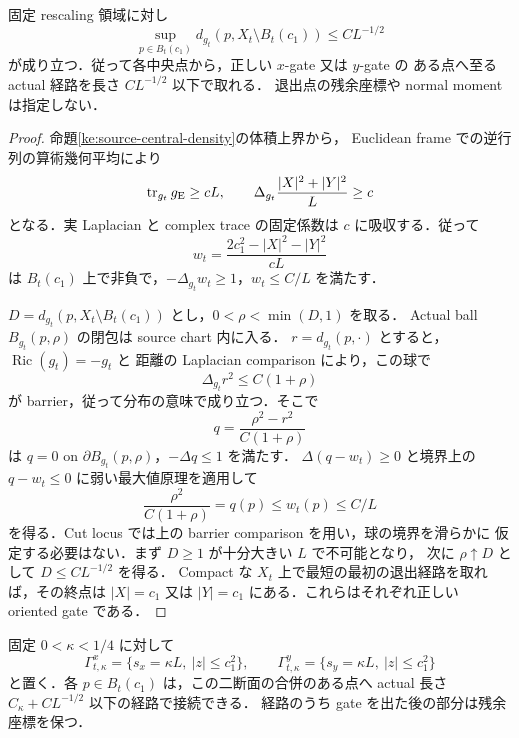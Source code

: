 \begin{proposition}
\label{ke:source-central-short-escape}
固定 rescaling 領域に対し
\begin{equation}\label{ke:eq:source-central-short-escape}
 \sup_{p\in B_t(c_1)}d_{g_t}(p,X_t\setminus B_t(c_1))
 \le CL^{-1/2}
\end{equation}
が成り立つ．従って各中央点から，正しい $x$-gate 又は $y$-gate の
ある点へ至る actual 経路を長さ $CL^{-1/2}$ 以下で取れる．
退出点の残余座標や normal moment は指定しない．
\end{proposition}

\begin{proof}
命題\ref{ke:source-central-density}の体積上界から，
Euclidean frame での逆行列の算術幾何平均により
\[
 \operatorname{tr}_{g_t}g_{\rm E}\ge cL,
 \qquad \Delta_{g_t}\frac{|X|^2+|Y|^2}{L}\ge c
\]
となる．実 Laplacian と complex trace の固定係数は $c$ に吸収する．従って
\[
 w_t=\frac{2c_1^2-|X|^2-|Y|^2}{cL}
\]
は $B_t(c_1)$ 上で非負で，$-\Delta_{g_t}w_t\ge1$，$w_t\le C/L$ を満たす．

$D=d_{g_t}(p,X_t\setminus B_t(c_1))$ とし，$0<\rho<\min(D,1)$ を取る．
Actual ball $B_{g_t}(p,\rho)$ の閉包は source chart 内に入る．
$r=d_{g_t}(p,\cdot)$ とすると，$\operatorname{Ric}(g_t)=-g_t$ と
距離の Laplacian comparison により，この球で
\[
 \Delta_{g_t}r^2\le C(1+\rho)
\]
が barrier，従って分布の意味で成り立つ．そこで
\[
 q=\frac{\rho^2-r^2}{C(1+\rho)}
\]
は $q=0$ on $\partial B_{g_t}(p,\rho)$，$-\Delta q\le1$ を満たす．
$\Delta(q-w_t)\ge0$ と境界上の $q-w_t\le0$ に弱い最大値原理を適用して
\[
 \frac{\rho^2}{C(1+\rho)}=q(p)\le w_t(p)\le C/L
\]
を得る．Cut locus では上の barrier comparison を用い，球の境界を滑らかに
仮定する必要はない．まず $D\ge1$ が十分大きい $L$ で不可能となり，
次に $\rho\uparrow D$ として $D\le CL^{-1/2}$ を得る．
Compact な $X_t$ 上で最短の最初の退出経路を取れば，その終点は
$|X|=c_1$ 又は $|Y|=c_1$ にある．これらはそれぞれ正しい oriented gate である．
\end{proof}

\begin{corollary}
\label{ke:source-central-arm-connectors}
固定 $0<\kappa<1/4$ に対して
\[
 \Gamma^x_{t,\kappa}
 =\{s_x=\kappa L,\ |z|\le c_1^2\},\qquad
 \Gamma^y_{t,\kappa}
 =\{s_y=\kappa L,\ |z|\le c_1^2\}
\]
と置く．各 $p\in B_t(c_1)$ は，この二断面の合併のある点へ
actual 長さ $C_\kappa+CL^{-1/2}$ 以下の経路で接続できる．
経路のうち gate を出た後の部分は残余座標を保つ．
\end{corollary}

